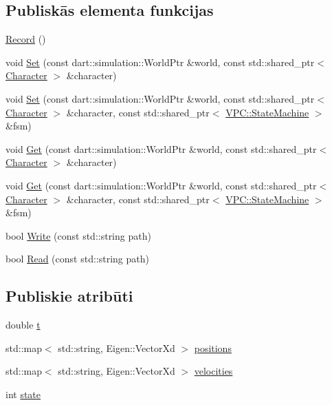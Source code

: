 \subsection*{Publiskās elementa funkcijas}
\begin{DoxyCompactItemize}
\item 
\hyperlink{class_v_p_c_1_1_record_abe141f694c3d8691ad8cc87d37aea170}{Record} ()
\item 
void \hyperlink{class_v_p_c_1_1_record_a9a4211edc9dd0352403d3e501366ba53}{Set} (const dart\+::simulation\+::\+World\+Ptr \&world, const std\+::shared\+\_\+ptr$<$ \hyperlink{class_v_p_c_1_1_character}{Character} $>$ \&character)
\item 
void \hyperlink{class_v_p_c_1_1_record_a9730edac5935812b4227ad4598cb80bc}{Set} (const dart\+::simulation\+::\+World\+Ptr \&world, const std\+::shared\+\_\+ptr$<$ \hyperlink{class_v_p_c_1_1_character}{Character} $>$ \&character, const std\+::shared\+\_\+ptr$<$ \hyperlink{class_v_p_c_1_1_state_machine}{V\+P\+C\+::\+State\+Machine} $>$ \&fsm)
\item 
void \hyperlink{class_v_p_c_1_1_record_a80c82d06a0d90252190f4e5071957924}{Get} (const dart\+::simulation\+::\+World\+Ptr \&world, const std\+::shared\+\_\+ptr$<$ \hyperlink{class_v_p_c_1_1_character}{Character} $>$ \&character)
\item 
void \hyperlink{class_v_p_c_1_1_record_a7ddfb79220b19b61a3c5ae6b0beb43d7}{Get} (const dart\+::simulation\+::\+World\+Ptr \&world, const std\+::shared\+\_\+ptr$<$ \hyperlink{class_v_p_c_1_1_character}{Character} $>$ \&character, const std\+::shared\+\_\+ptr$<$ \hyperlink{class_v_p_c_1_1_state_machine}{V\+P\+C\+::\+State\+Machine} $>$ \&fsm)
\item 
bool \hyperlink{class_v_p_c_1_1_record_a7d6345bdfc4e90a48bae74ffd3627ee5}{Write} (const std\+::string path)
\item 
bool \hyperlink{class_v_p_c_1_1_record_a2d51f0fb1ab4eceb47e8eb1c9d0d216c}{Read} (const std\+::string path)
\end{DoxyCompactItemize}
\subsection*{Publiskie atribūti}
\begin{DoxyCompactItemize}
\item 
double \hyperlink{class_v_p_c_1_1_record_af9b5867d85eb7d0073ced8bd09a79626}{t}
\item 
std\+::map$<$ std\+::string, Eigen\+::\+Vector\+Xd $>$ \hyperlink{class_v_p_c_1_1_record_aeea0f4576199ce09ffc7870c792624d0}{positions}
\item 
std\+::map$<$ std\+::string, Eigen\+::\+Vector\+Xd $>$ \hyperlink{class_v_p_c_1_1_record_a6d0ac69f7cb390fd819cb006f23d6e32}{velocities}
\item 
int \hyperlink{class_v_p_c_1_1_record_aefdcae9a398f483c7a4c61b6a43307e5}{state}
\end{DoxyCompactItemize}



